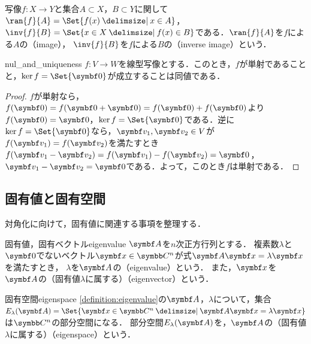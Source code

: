 \documentclass[../../main]{subfiles}
\begin{document}
\begin{note}
  写像\(f\colon X\to Y\)と集合\(A\subset X\)，\(B\subset Y\)に関して\(\ran{f}{A}=\Set{f(x)\given x\in A}\)，
  \(\inv{f}{B}=\Set{x\in X\given f(x)\in B}\)である．\(\ran{f}{A}\)を\(f\)による\(A\)の（image），
  \(\inv{f}{B}\)を\(f\)による\(B\)の（inverse image）という．
\end{note}

\begin{proposition}{}{nul_and_uniqueness}
  \(f\colon V\to W\)を線型写像とする．このとき，\(f\)が単射であることと，\(\ker f=\Set{\zvec}\)が成立することは同値である．
\end{proposition}

\begin{proof}
  \(f\)が単射なら，\(f(\zvec)=f(\zvec+\zvec)=f(\zvec)+f(\zvec)\)より\(f(\zvec)=\zvec\)，\(\ker f=\Set{\zvec}\)である．逆に\(\ker f=\Set{\zvec}\)なら，\(\vect{v}_1,\vect{v}_2\in V\)が\(f(\vect{v}_1)=f(\vect{v}_2)\)を満たすとき
  \(f(\vect{v}_1-\vect{v}_2)=f(\vect{v}_1)-f(\vect{v}_2)=\zvec\)，\(\vect{v}_1-\vect{v}_2=\zvec\)である．よって，このとき\(f\)は単射である．
\end{proof}

\subsection{固有値と固有空間}

対角化に向けて，固有値に関連する事項を整理する．

\begin{definition}{固有値，固有ベクトル}{eigenvalue}
  \(\mat{A}\)を\(n\)次正方行列とする．
  複素数\(\lambda\)と\(\zvec\)でないベクトル\(\vect{x}\in\numset{C}^n\)が式\(\mat{A}\vect{x}=\lambda\vect{x}\)を満たすとき，
  \(\lambda\)を\(\mat{A}\)の（eigenvalue）という．
  また，\(\vect{x}\)を\(\mat{A}\)の（固有値\(\lambda\)に属する）（eigenvector）という．
\end{definition}

\begin{definition}{固有空間}{eigenspace}
  \cref{definition:eigenvalue}の\(\mat{A}\)，\(\lambda\)について，集合\(E_\lambda(\mat{A})=\Set{\vect{x}\in\numset{C}^n\given\mat{A}\vect{x}=\lambda\vect{x}}\)は\(\numset{C}^n\)の部分空間になる．
  部分空間\(E_\lambda(\mat{A})\)を，\(\mat{A}\)の（固有値\(\lambda\)に属する）（eigenspace）という．
\end{definition}
\end{document}
